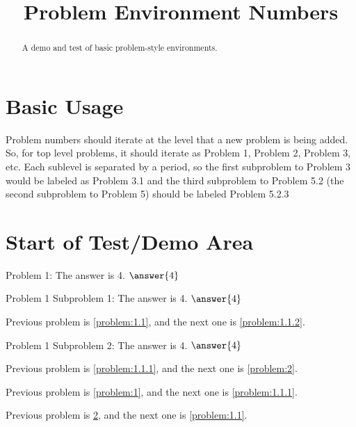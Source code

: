 \documentclass{ximera}
\title{Problem Environment Numbers}
\begin{document}
\begin{abstract}
    A demo and test of basic problem-style environments.
\end{abstract}
\maketitle

\section{Basic Usage}
Problem numbers should iterate at the level that a new problem is being added. So, for top level problems, it should iterate as
Problem 1, Problem 2, Problem 3, etc. Each sublevel is separated by a period, so the first subproblem to Problem 3 would be
labeled as Problem 3.1 and the third subproblem to Problem 5.2 (the second subproblem to Problem 5) should be labeled Problem 5.2.3

\section{Start of Test/Demo Area}

\newcommand{\prevnext}[2]{%
    \par\medskip
    Previous problem is \ref{#1}, and the next one is \ref{#2}.
    \medskip
}

\begin{problem}\label{problem:1}
    \begin{problem}\label{problem:1.1}
        Problem 1: The answer is 4. $\answer{4}$ 
        \begin{problem}\label{problem:1.1.1}
            Problem 1 Subproblem 1: The answer is 4. $\answer{4}$ 
            \prevnext{problem:1.1}{problem:1.1.2}
        \end{problem} 
        \begin{problem}\label{problem:1.1.2}
            Problem 1 Subproblem 2: The answer is 4. $\answer{4}$ 
            \prevnext{problem:1.1.1}{problem:2}
        \end{problem} 
        \prevnext{problem:1}{problem:1.1.1}
    \end{problem} 
    \prevnext{}{problem:1.1}
\end{problem} 
\end{document}
